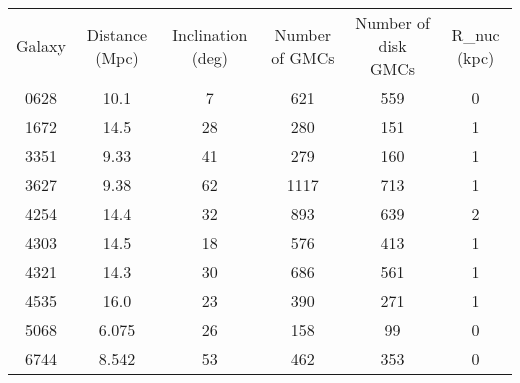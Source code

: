 \begin{table}
\begin{tabular}{cccccc}
Galaxy & Distance (Mpc) & Inclination (deg) & Number of GMCs & Number of disk GMCs & R_{nuc} (kpc) \\
0628 & 10.1 & 7 & 621 & 559 & 0 \\
1672 & 14.5 & 28 & 280 & 151 & 1 \\
3351 & 9.33 & 41 & 279 & 160 & 1 \\
3627 & 9.38 & 62 & 1117 & 713 & 1 \\
4254 & 14.4 & 32 & 893 & 639 & 2 \\
4303 & 14.5 & 18 & 576 & 413 & 1 \\
4321 & 14.3 & 30 & 686 & 561 & 1 \\
4535 & 16.0 & 23 & 390 & 271 & 1 \\
5068 & 6.075 & 26 & 158 & 99 & 0 \\
6744 & 8.542 & 53 & 462 & 353 & 0 \\
\end{tabular}
\end{table}
